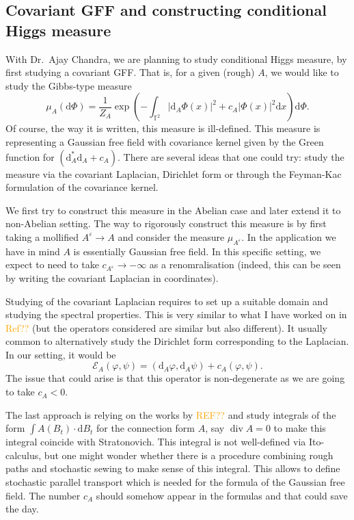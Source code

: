 \documentclass[12pt]{article}
\numberwithin{equation}{section}
\theoremstyle{definition}
\theoremstyle{remark}
\newcommand{\diff}{\mathrm{d}}
\newcommand{\1}{\mathbf 1}
\newcommand{\<}{\langle}
\renewcommand{\>}{\rangle}
\newcommand{\orange}[1]{\textcolor{orange}{#1}}
\newcommand{\bT}{\mathbb T}
\begin{document}
\subsection{Covariant GFF and constructing conditional Higgs measure}
With Dr.\ Ajay Chandra, we are planning to study conditional Higgs measure, by first studying a covariant GFF. That is, for a given (rough) $A$, we would like to study the Gibbs-type measure
\[
\mu_A(\diff\Phi)=\frac 1 {Z_A} \exp\left( -\int_{\bT^2}|\diff_A\Phi(x)|^2+c_A|\Phi(x)|^2\diff x\right)\diff\Phi. 
\]
Of course, the way it is written, this measure is ill-defined. This measure is representing a Gaussian free field with covariance kernel given by the Green function for $(\diff_A^*\diff_A+c_A)$. There are several ideas that one could try: study the measure via the covariant Laplacian, Dirichlet form or through the Feyman-Kac formulation of the covariance kernel. 

We first try to construct this measure in the Abelian case and later extend it to non-Abelian setting. The way to rigorously construct this measure is by first taking a mollified $A^\varepsilon\to A$ and consider the measure $\mu_{A^\varepsilon}$. In the application we have in mind $A$ is essentially Gaussian free field. In this specific setting, we expect to need to take $c_{A^\varepsilon}\to-\infty$ as a renomralisation (indeed, this can be seen by writing the covariant Laplacian in coordinates). 

Studying of the covariant Laplacian requires to set up a suitable domain and studying the spectral properties. This is very similar to what I have worked on in \orange{Ref??} (but the operators considered are similar but also different). It usually common to alternatively study the Dirichlet form corresponding to the Laplacian. In our setting, it would be 
\[
\mathcal E_A(\varphi,\psi)=(\diff_A\varphi,\diff_A\psi)+c_A(\varphi,\psi).
\]
The issue that could arise is that this operator is non-degenerate as we are going to take $c_A< 0$. 

The last approach is relying on the works by \orange{REF??} and study integrals of the form $\int A(B_t)\cdot\diff B_t$ for the connection form $A$, say $\operatorname{div} A=0$ to make this integral coincide with Stratonovich. This integral is not well-defined via Ito-calculus, but one might wonder whether there is a procedure combining rough paths and stochastic sewing to make sense of this integral. This allows to define stochastic parallel transport which is needed for the formula of the Gaussian free field. The number $c_A$ should somehow appear in the formulas and that could save the day. 
\end{document}
